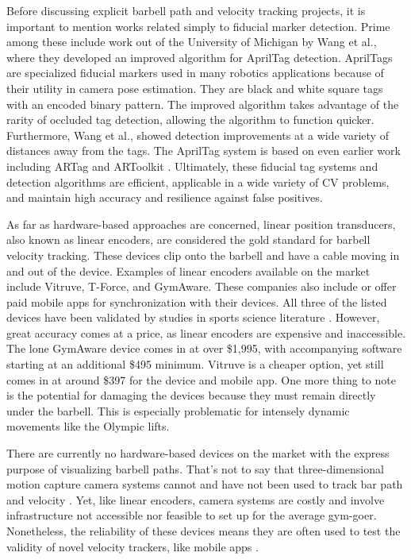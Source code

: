 \documentclass[10pt,twocolumn]{article}
\begin{document}
Before discussing explicit barbell path and velocity tracking projects, it is important to mention works related simply to fiducial marker detection. 
Prime among these include work out of the University of Michigan by Wang et al., where they developed an improved algorithm for AprilTag detection. 
AprilTags are specialized fiducial markers used in many robotics applications because of their utility in camera pose estimation. 
They are black and white square tags with an encoded binary pattern. 
The improved algorithm takes advantage of the rarity of occluded tag detection, allowing the algorithm to function quicker. 
Furthermore, Wang et al., showed detection improvements at a wide variety of distances away from the tags. 
The AprilTag system is based on even earlier work including ARTag and ARToolkit \cite{Kato1999,Fiala2005}. 
Ultimately, these fiducial tag systems and detection algorithms are efficient, applicable in a wide variety of CV problems, and maintain high accuracy and resilience against false positives. \par

As far as hardware-based approaches are concerned, linear position transducers, also known as linear encoders, are considered the gold standard for barbell velocity tracking.
These devices clip onto the barbell and have a cable moving in and out of the device.
Examples of linear encoders available on the market include Vitruve, T-Force, and GymAware. 
These companies also include or offer paid mobile apps for synchronization with their devices.
All three of the listed devices have been validated by studies in sports science literature \cite{Martinez-Cava2020, Wadhi2018, PerezCastilla2019}.
However, great accuracy comes at a price, as linear encoders are expensive and inaccessible.
The lone GymAware device comes in at over \$1,995, with accompanying software starting at an additional \$495 minimum.
Vitruve is a cheaper option, yet still comes in at around \$397 for the device and mobile app. 
One more thing to note is the potential for damaging the devices because they must remain directly under the barbell.
This is especially problematic for intensely dynamic movements like the Olympic lifts.\par

There are currently no hardware-based devices on the market with the express purpose of visualizing barbell paths.
That's not to say that three-dimensional motion capture camera systems cannot and have not been used to track bar path and velocity \cite{PerezCastilla2019}.
Yet, like linear encoders, camera systems are costly and involve infrastructure not accessible nor feasible to set up for the average gym-goer.
Nonetheless, the reliability of these devices means they are often used to test the validity of novel velocity trackers, like mobile apps \cite{PerezCastilla2019}. \par
\end{document}
